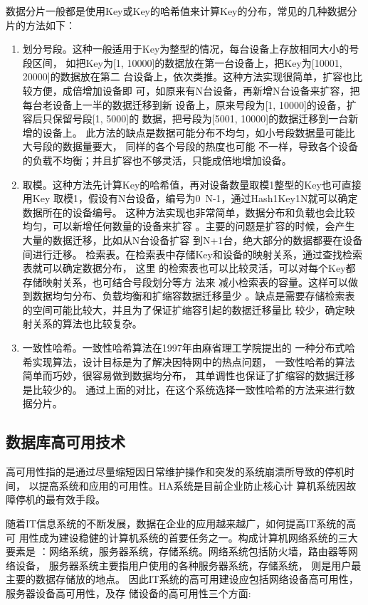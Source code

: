 数据分片一般都是使用Key或Key的哈希值来计算Key的分布，常见的几种数据分片的方法如下：
\begin{enumerate}
	\item 划分号段。这种一般适用于Key为整型的情况，每台设备上存放相同大小的号段区间，
	如把Key为[1, 10000]的数据放在第一台设备上，把Key为[10001, 20000]的数据放在第二
	台设备上，依次类推。这种方法实现很简单，扩容也比较方便，成倍增加设备即
	可，如原来有N台设备，再新增N台设备来扩容，把每台老设备上一半的数据迁移到新
	设备上，原来号段为[1, 10000]的设备，扩容后只保留号段[1, 5000]的
	数据，把号段为[5001, 10000]的数据迁移到一台新增的设备上。
	此方法的缺点是数据可能分布不均匀，如小号段数据量可能比大号段的数据量要大，
	同样的各个号段的热度也可能
	不一样，导致各个设备的负载不均衡；并且扩容也不够灵活，只能成倍地增加设备。
	
	\item 取模。这种方法先计算Key的哈希值，再对设备数量取模1整型的Key也可直接用Key
	取模1，假设有N台设备，编号为0~N-1，通过Hash1Key1N就可以确定数据所在的设备编号。
	这种方法实现也非常简单，数据分布和负载也会比较均匀，可以新增任何数量的设备来扩容
	。主要的问题是扩容的时候，会产生大量的数据迁移，比如从N台设备扩容
	到N+1台，绝大部分的数据都要在设备间进行迁移。
	检索表。在检索表中存储Key和设备的映射关系，通过查找检索表就可以确定数据分布，
	这里
	的检索表也可以比较灵活，可以对每个Key都存储映射关系，也可结合号段划分等方
	法来
	减小检索表的容量。这样可以做到数据均匀分布、负载均衡和扩缩容数据迁移量少
	。缺点是需要存储检索表的空间可能比较大，并且为了保证扩缩容引起的数据迁移量比
	较少，确定映射关系的算法也比较复杂。
	
	\item 一致性哈希。一致性哈希算法在1997年由麻省理工学院提出的
	一种分布式哈希实现算法，设计目标是为了解决因特网中的热点问题，
	一致性哈希的算法简单而巧妙，很容易做到数据均分布，
	其单调性也保证了扩缩容的数据迁移是比较少的。
	通过上面的对比，在这个系统选择一致性哈希的方法来进行数据分片。
\end{enumerate}
\subsection{数据库高可用技术}
高可用性指的是通过尽量缩短因日常维护操作和突发的系统崩溃所导致的停机时间，
以提高系统和应用的可用性。HA系统是目前企业防止核心计
算机系统因故障停机的最有效手段。

随着IT信息系统的不断发展，数据在企业的应用越来越广，如何提高IT系统的高可
用性成为建设稳健的计算机系统的首要任务之一。构成计算机网络系统的三大要素是
：网络系统，服务器系统，存储系统。网络系统包括防火墙，路由器等网络设备，
服务器系统主要指用户使用的各种服务器系统，存储系统，
则是用户最主要的数据存储放的地点。
因此IT系统的高可用建设应包括网络设备高可用性，服务器设备高可用性，及存
储设备的高可用性三个方面:

